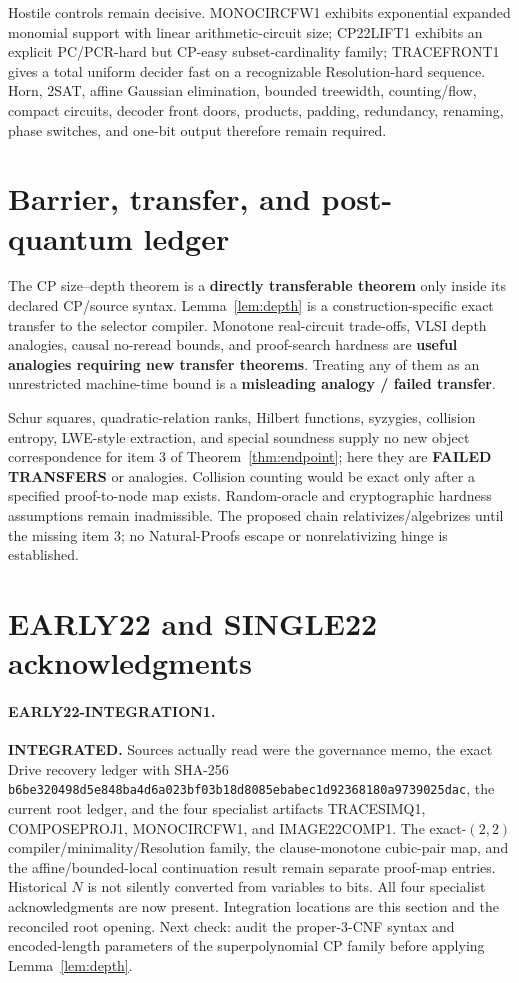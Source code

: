 \documentclass[11pt]{article}
\begin{document}
Hostile controls remain decisive.  MONOCIRCFW1 exhibits exponential expanded
monomial support with linear arithmetic-circuit size; CP22LIFT1 exhibits an
explicit PC/PCR-hard but CP-easy subset-cardinality family; TRACEFRONT1 gives
a total uniform decider fast on a recognizable Resolution-hard sequence.
Horn, 2SAT, affine Gaussian elimination, bounded treewidth, counting/flow,
compact circuits, decoder front doors, products, padding, redundancy,
renaming, phase switches, and one-bit output therefore remain required.

\section{Barrier, transfer, and post-quantum ledger}

The CP size--depth theorem is a \textbf{directly transferable theorem} only
inside its declared CP/source syntax.  Lemma~\ref{lem:depth} is a
construction-specific exact transfer to the selector compiler.  Monotone
real-circuit trade-offs, VLSI depth analogies, causal no-reread bounds, and
proof-search hardness are \textbf{useful analogies requiring new transfer
theorems}.  Treating any of them as an unrestricted machine-time bound is a
\textbf{misleading analogy / failed transfer}.

Schur squares, quadratic-relation ranks, Hilbert functions, syzygies,
collision entropy, LWE-style extraction, and special soundness supply no
new object correspondence for item 3 of Theorem~\ref{thm:endpoint}; here
they are \textbf{FAILED TRANSFERS} or analogies.  Collision counting would
be exact only after a specified proof-to-node map exists.  Random-oracle and
cryptographic hardness assumptions remain inadmissible.  The proposed chain
relativizes/algebrizes until the missing item 3; no Natural-Proofs escape or
nonrelativizing hinge is established.

\section{EARLY22 and SINGLE22 acknowledgments}

\paragraph{EARLY22-INTEGRATION1.}
\textbf{INTEGRATED.}  Sources actually read were the governance memo, the
exact Drive recovery ledger with SHA-256
\texttt{b6be320498d5e848ba4d6a023bf03b18d8085ebabec1d92368180a9739025dac},
the current root ledger, and the four specialist artifacts TRACESIMQ1,
COMPOSEPROJ1, MONOCIRCFW1, and IMAGE22COMP1.  The exact-$(2,2)$
compiler/minimality/Resolution family, the clause-monotone cubic-pair map,
and the affine/bounded-local continuation result remain separate proof-map
entries.  Historical $N$ is not silently converted from variables to bits.
All four specialist acknowledgments are now present.  Integration locations
are this section and the reconciled root opening.  Next check: audit the
proper-3-CNF syntax and encoded-length parameters of the superpolynomial CP
family before applying Lemma~\ref{lem:depth}.
\end{document}

